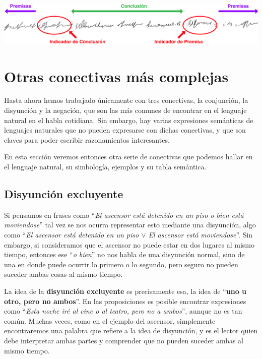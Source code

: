 \includegraphics[scale=0.5]{unidades/3_logica/2_logica_proposicional/imagenes/indicadores_conclusion_y_premisa.png}

\section{Otras conectivas más complejas}
\label{chap:logica_proposicional:sec:otras_conectivas}

Hasta ahora hemos trabajado únicamente con tres conectivas, la conjunción, la
disyunción y la negación, que son las más comunes de encontrar en el lenguaje
natural en el habla cotidiana. Sin embargo, hay varias expresiones semánticas de
lenguajes naturales que no pueden expresarse con dichas conectivas, y que son
claves para poder escribir razonamientos interesantes.

En esta sección veremos entonces otra serie de conectivas que podemos hallar en
el lenguaje natural, su simbología, ejemplos y su tabla semántica.

\subsection{Disyunción excluyente}
\label{chap:logica_proposicional:subsec:xor}

Si pensamos en frases como ``\textit{El ascensor está detenido en un piso o bien
está moviendose}'' tal vez se nos ocurra representar esto mediante una
disyunción, algo como ``\textit{El ascensor está detenido en un piso $\lor$ El
ascensor está moviendose}''. Sin embargo, si consideramos que el ascensor no
puede estar en dos lugares al mismo tiempo, entonces ese ``\textit{o bien}'' no
nos habla de una disyunción normal, sino de una en donde puede ocurrir lo
primero o lo segundo, pero seguro no pueden suceder ambas cosas al mismo tiempo.

La idea de la \textbf{disyunción excluyente} es precisamente esa, la idea de
``\textbf{uno u otro, pero no ambos}''. En las proposiciones es posible
encontrar expresiones como ``\textit{Esta noche iré al cine o al teatro, pero no
a ambos}'', aunque no es tan común. Muchas veces, como en el ejemplo del
ascensor, simplemente encontraremos una palabra que refiere a la idea de
disyunción, y es el lector quien debe interpretar ambas partes y comprender que
no pueden suceder ambas al mismo tiempo.


